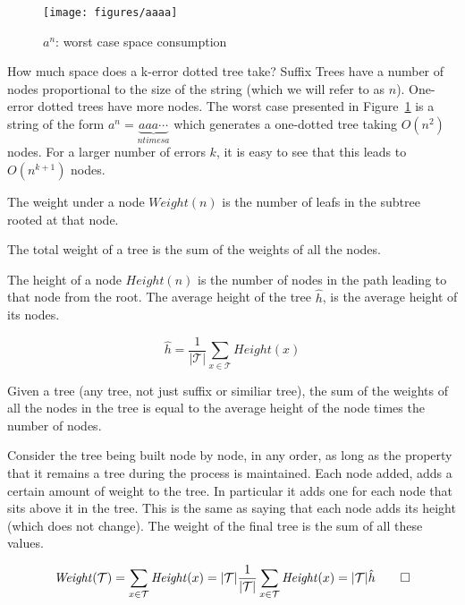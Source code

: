\begin{figure}
\texttt{[image: figures/aaaa]}
\caption{$a^n$: worst case space consumption}%
\label{fig:aaaa}
\end{figure}

How much space does a k-error dotted tree take? Suffix Trees have a number of nodes proportional to the size of the string (which we will refer to as $n$). One-error dotted trees have more nodes. The worst case presented in Figure~\ref{fig:aaaa} is a string of the form $a^n = \underbrace{aaa\cdots}_{n \mathit{times }a}$ which generates a one-dotted tree taking $O(n^2)$ nodes. For a larger number of errors $k$, it is easy to see that this leads to $O(n^{k+1})$ nodes.

\begin{definition}
The weight under a node $\mathit{Weight}(n)$ is the number of leafs in the subtree rooted at that node.

The total weight of a tree is the sum of the weights of all the nodes.
\end{definition}

\begin{definition}
The height of a node $\mathit{Height}(n)$ is the number of nodes in the path leading to that node from the root. The average height of the tree $\hat{h}$, is the average height of its nodes.

\[ \hat{h} = \frac{1}{|\mathcal{T}|} \sum_{x \in \mathit{\mathcal{T}}} \mathit{Height}(x) \]
\end{definition}

\begin{lemma}
Given a tree (any tree, not just suffix or similiar tree), the sum of the weights of all the nodes in the tree is equal to the average height of the node times the number of nodes.
\end{lemma}

Consider the tree being built node by node, in any order, as long as the property that it remains a tree during the process is maintained. Each node added, adds a certain amount of weight to the tree. In particular it adds one for each node that sits above it in the tree. This is the same as saying that each node adds its height (which does not change). The weight of the final tree is the sum of all these values.

\[ \mathit{Weight}(\mathcal{T}) = \sum_{x \in \mathcal{T}}\mathit{Height}(x) = |\mathcal{T}|\frac{1}{|\mathcal{T}|}\sum_{x \in \mathcal{T}}\mathit{Height}(x) = |\mathcal{T}|\hat{h} \qed \]

